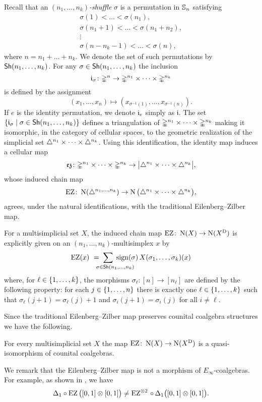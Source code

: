 Recall that an \textit{$(n_1,\dots,n_k)$-shuffle} $\sigma$ is a permutation in $\sym_n$ satisfying
\begin{gather*}
	\sigma(1) < \dots < \sigma(n_1), \\
	\sigma(n_1+1) < \dots < \sigma(n_1+n_2), \\
	\vdots \\
	\sigma(n-n_k-1) < \dots < \sigma(n),
\end{gather*}
where $n = n_1+\dots+n_k$.
We denote the set of such permutations by $\Sh(n_1,\dots,n_k)$.
For any $\sigma \in \Sh(n_1,\dots,n_k)$ the inclusion
\[
\gi_\sigma \colon \gsimplex^n \to \gmsimplex{n_1}{n_k}
\]
is defined by the assignment
\[
(x_1,\dots,x_n) \mapsto (x_{\sigma^{-1}(1)}, \dots, x_{\sigma^{-1}(n)}).
\]
If $e$ is the identity permutation, we denote $\gi_{e}$ simply as $\mathfrak{i}$.
The set $\set{\gi_\sigma \mid \sigma \in \Sh(n_1,\dots,n_k)}$ defines a triangulation of $\gmsimplex{n_1}{n_k}$ making it isomorphic, in the category of cellular spaces, to the geometric realization of the simplicial set $\msimplex{n_1}{n_k}$.
Using this identification, the identity map induces a cellular map
\[
\ez \colon \gmsimplex{n_1}{n_k} \to \bars[\big]{\msimplex{n_1}{n_k}},
\]
whose induced chain map
\[
\EZ \colon \chains(\simplex^{n_1,\dots,n_k}) \to \chains\big(\msimplex{n_1}{n_k}\big),
\]
agrees, under the natural identifications, with the traditional Eilenberg--Zilber map.

For a multisimplicial set $X$, the induced chain map $\EZ \colon \chains(X) \to \chains(X^\diag)$ is explicitly given on an $(n_1,\dots,n_k)$-multisimplex $x$ by
\[
\EZ(x) \ = \sum_{\qquad \crampedclap{\sigma \in \Sh(n_1,\dots,n_k)}} \sign(\sigma) \, X(\sigma_1 ,\dots, \sigma_k)(x)
\]
where, for $\ell \in \set{1,\dots,k}$, the morphisms $\sigma_\ell \colon [n] \to [n_\ell]$ are defined by the following property: for
each $j \in \set{1,\dots,n}$ there is exactly one $\ell \in \set{1,\dots,k}$ such that $\sigma_\ell(j+1) = \sigma_\ell(j)+1$ and $\sigma_i(j+1) = \sigma_i(j)$ for all $i \neq \ell$.


Since the traditional Eilenberg--Zilber map preserves counital coalgebra structures we have the following.

\begin{theorem}
	For every multisimplicial set $X$ the map $\EZ \colon \chains(X) \to \chains(X^\diag)$ is a quasi-isomorphism of counital coalgebras.
\end{theorem}

We remark that the Eilenberg--Zilber map is not a morphism of $E_\infty$-coalgebras.
For example, as shown in \cite[\S5.4]{medina2022cube_einfty}, we have
\[
\Delta_1 \circ \EZ\big([0,1] \ot [0,1]\big) \neq
\EZ ^{\otimes 2}\, \circ \, \Delta_1\big([0,1] \ot [0,1]\big).
\]

